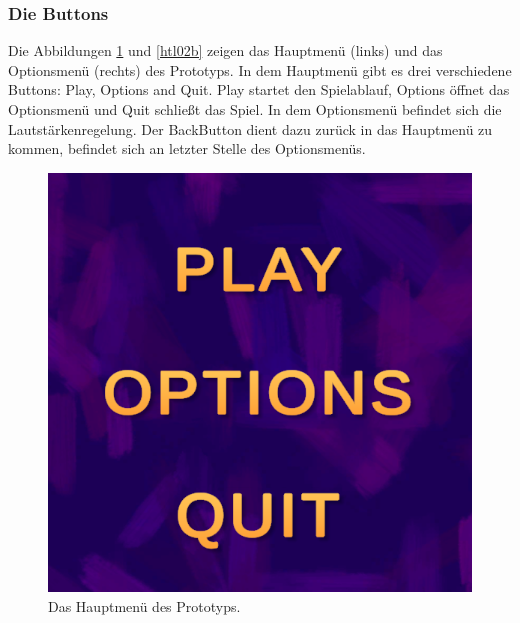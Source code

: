 \subsubsection{Die Buttons}
Die Abbildungen \ref{htl02a} und \ref{htl02b} zeigen das Hauptmenü (links) und das Optionsmenü (rechts) des Prototyps. In dem Hauptmenü gibt es drei verschiedene Buttons: Play, Options and Quit. Play startet den Spielablauf, Options öffnet das Optionsmenü und Quit schließt das Spiel. In dem Optionsmenü befindet sich die Lautstärkenregelung. Der \glqq Back\grqq \space Button dient dazu zurück in das Hauptmenü zu kommen, befindet sich an letzter Stelle des Optionsmenüs.

\begin{figure}[H]
    \centering
    \begin{minipage}{0.4\textwidth}
        \centering
        \includegraphics[width=\linewidth]{chapters/03/images/MainMenu.png}
        \caption{Das Hauptmenü des Prototyps.}
        \label{htl02a}
    \end{minipage}%
    \hspace{1cm}%
    \begin{minipage}{0.4\textwidth}
        \centering

\end{minipage}
\end{figure}
